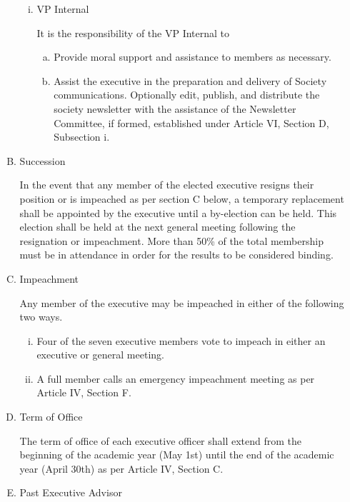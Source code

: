 \documentclass[11pt]{article}
\begin{document}
\begin{enumerate}[I.]
\begin{enumerate}[A)]
\begin{enumerate}[i)]
            \item VP Internal
            
            It is the responsibility of the VP Internal to
            \begin{enumerate}[a)]
            \item Provide moral support and assistance to members as necessary.
            \item Assist the executive in the preparation and delivery of Society communications.
              Optionally edit, publish, and distribute the society
                newsletter with the assistance of the Newsletter Committee, if
                formed, established under Article VI, Section D, Subsection i.
            \end{enumerate}
        \end{enumerate}
        \item Succession

        In the event that any member of the elected executive resigns their
        position or is impeached as per section C below, a temporary
        replacement shall be appointed by the executive until a by-election
        can be held. This election shall be held at the next general meeting
        following the resignation or impeachment. More than 50\% of the total membership must be in attendance in order for the results to be
        considered binding.
        \item Impeachment

        Any member of the executive may be impeached in either of the
        following two ways.
          \begin{enumerate}[i)]
            \item Four of the seven executive members vote to impeach in
              either an executive or general meeting.
            \item A full member calls an emergency impeachment meeting as per Article IV, Section F.
          \end{enumerate}
        \item Term of Office

        The term of office of each executive officer shall extend from the beginning of the academic year (May 1st)
        until the end of the academic year (April 30th) as per Article IV, Section C.

        \item Past Executive Advisor


\end{enumerate}
\end{enumerate}
\end{document}
